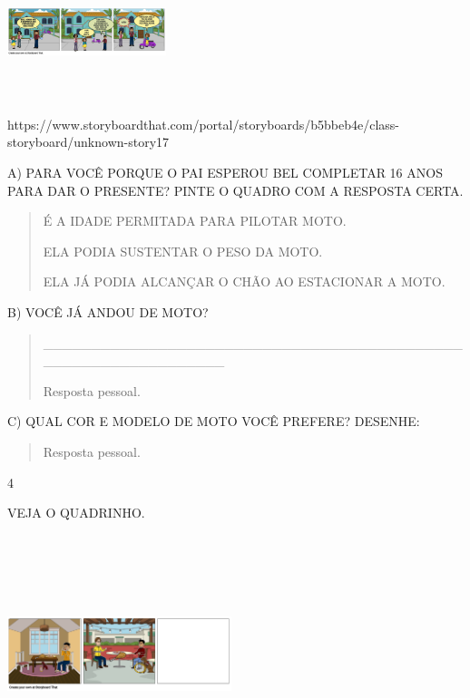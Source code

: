 {{\includegraphics[width=1.82014in,height=1.55486in]{media/image130.png}

https://www.storyboardthat.com/portal/storyboards/b5bbeb4e/class-storyboard/unknown-story17

A) PARA VOCÊ PORQUE O PAI ESPEROU BEL COMPLETAR 16 ANOS PARA DAR O
PRESENTE? PINTE O QUADRO COM A RESPOSTA CERTA.

\begin{quote}
É A IDADE PERMITADA PARA PILOTAR MOTO.

ELA PODIA SUSTENTAR O PESO DA MOTO.

ELA JÁ PODIA ALCANÇAR O CHÃO AO ESTACIONAR A MOTO.
\end{quote}

B) VOCÊ JÁ ANDOU DE MOTO?

\begin{quote}
\_\_\_\_\_\_\_\_\_\_\_\_\_\_\_\_\_\_\_\_\_\_\_\_\_\_\_\_\_\_\_\_\_\_\_\_\_\_\_\_\_\_\_\_\_\_\_\_\_\_\_\_\_\_\_\_\_\_\_\_\_\_\_

Resposta pessoal.
\end{quote}

C) QUAL COR E MODELO DE MOTO VOCÊ PREFERE? DESENHE:

\begin{quote}
Resposta pessoal.
\end{quote}

\num{4}

VEJA O QUADRINHO.

\includegraphics[width=2.57222in,height=2.73403in]{media/image131.png}

}}
